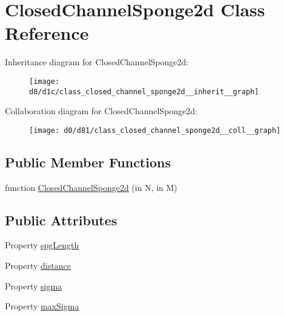 \hypertarget{class_closed_channel_sponge2d}{}\section{Closed\+Channel\+Sponge2d Class Reference}
\label{class_closed_channel_sponge2d}


Inheritance diagram for Closed\+Channel\+Sponge2d\+:
\nopagebreak
\begin{figure}[H]
\begin{center}
\leavevmode
\texttt{[image: d8/d1c/class\_closed\_channel\_sponge2d\_\_inherit\_\_graph]}
\end{center}
\end{figure}


Collaboration diagram for Closed\+Channel\+Sponge2d\+:
\nopagebreak
\begin{figure}[H]
\begin{center}
\leavevmode
\texttt{[image: d0/d81/class\_closed\_channel\_sponge2d\_\_coll\_\_graph]}
\end{center}
\end{figure}
\subsection*{Public Member Functions}
\begin{DoxyCompactItemize}
\item 
function \hyperlink{class_closed_channel_sponge2d_a3d2f7e3dfbff4f33f22e670e1941b4f5}{Closed\+Channel\+Sponge2d} (in N, in M)
\end{DoxyCompactItemize}
\subsection*{Public Attributes}
\begin{DoxyCompactItemize}
\item 
Property \hyperlink{class_closed_channel_sponge2d_a235a10d14b6beb2058693d1856f39833}{spg\+Length}
\item 
Property \hyperlink{class_closed_channel_sponge2d_a4c6447f66431d35d079639f70c18d3b3}{distance}
\item 
Property \hyperlink{class_closed_channel_sponge2d_a2864ea2868a5cc35d634928ab0b90931}{sigma}
\item 
Property \hyperlink{class_closed_channel_sponge2d_acb222bffecc37c4266ae6cc6eb5441b0}{max\+Sigma}
\end{DoxyCompactItemize}
